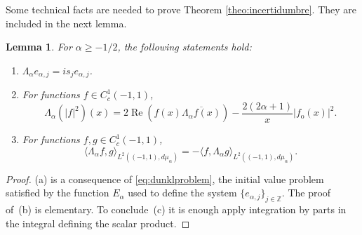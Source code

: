 \documentclass[a4paper]{amsart}
\theoremstyle{plain}
\newtheorem{Lem}{Lemma}
\theoremstyle{definition}
\renewcommand{\Re}{\operatorname{Re}}
\begin{document}
Some technical facts are needed to prove Theorem \ref{theo:incertidumbre}. They are included in the next lemma.
\begin{Lem}
\label{lem:tec}
For $\alpha\ge -1/2$, the following statements hold:
\begin{enumerate}
\item[(a)] $\Lambda_\alpha e_{\alpha,j}=is_j e_{\alpha,j}$.
\item[(b)] For functions $f\in C_c^1(-1,1)$,
\[
\Lambda_\alpha (|f|^2)(x)
= 2\Re (f(x)\overline{\Lambda_\alpha f(x)}) - \frac{2(2\alpha+1)}{x}|f_\textrm{o}(x)|^2.
\]
\item[(c)] For functions $f,g\in C_c^1(-1,1)$,
\[
\langle \Lambda_\alpha f,g\rangle_{L^2((-1,1),d\mu_\alpha)} 
= -\langle f, \Lambda_\alpha g\rangle_{L^2((-1,1),d\mu_\alpha)}.
\]
\end{enumerate}
\end{Lem}
\begin{proof}
(a) is a consequence of \eqref{eq:dunklproblem}, the initial value problem satisfied by the function $E_{\alpha}$ used to define the system $\{e_{\alpha,j}\}_{j\in \mathbb{Z}}$. The proof of~(b) is elementary. To conclude~(c) it is enough apply integration by parts in the integral defining the scalar product.
\end{proof}
\end{document}
